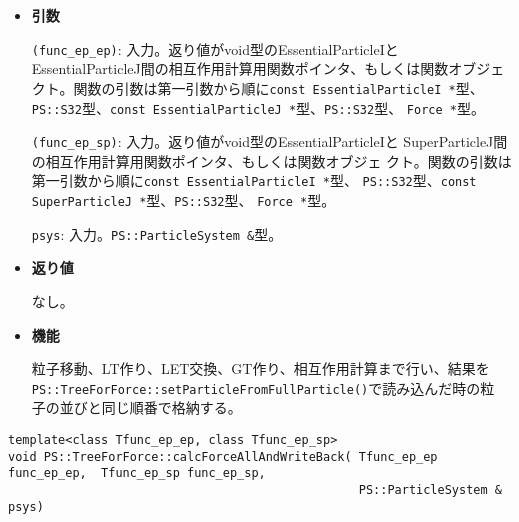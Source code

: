 \begin{itemize}

\item{{\bf 引数}}

{\tt (func\_ep\_ep)}: 入力。返り値がvoid型の{EssentialParticleI}と
{EssentialParticleJ}間の相互作用計算用関数ポインタ、もしくは関数オブジェ
クト。関数の引数は第一引数から順に{\tt const EssentialParticleI *}型、
{\tt PS::S32}型、{\tt const EssentialParticleJ *}型、{\tt PS::S32}型、
{\tt Force *}型。

{\tt (func\_ep\_sp)}: 入力。返り値がvoid型の{EssentialParticleI}と
{SuperParticleJ}間の相互作用計算用関数ポインタ、もしくは関数オブジェ
クト。関数の引数は第一引数から順に{\tt const EssentialParticleI *}型、
{\tt PS::S32}型、{\tt const SuperParticleJ *}型、{\tt PS::S32}型、
{\tt Force *}型。

{\tt psys}: 入力。{\tt PS::ParticleSystem \&}型。

\item{{\bf 返り値}}

なし。

\item{{\bf 機能}}

粒子移動、LT作り、LET交換、GT作り、相互作用計算まで行い、結果を\\
{\tt PS::TreeForForce::setParticleFromFullParticle()}で読み込んだ時の粒
子の並びと同じ順番で格納する。

\end{itemize}

\begin{screen}
\begin{verbatim}
template<class Tfunc_ep_ep, class Tfunc_ep_sp>
void PS::TreeForForce::calcForceAllAndWriteBack( Tfunc_ep_ep func_ep_ep,  Tfunc_ep_sp func_ep_sp, 
                                                 PS::ParticleSystem & psys) 

\end{verbatim}
\end{screen}

